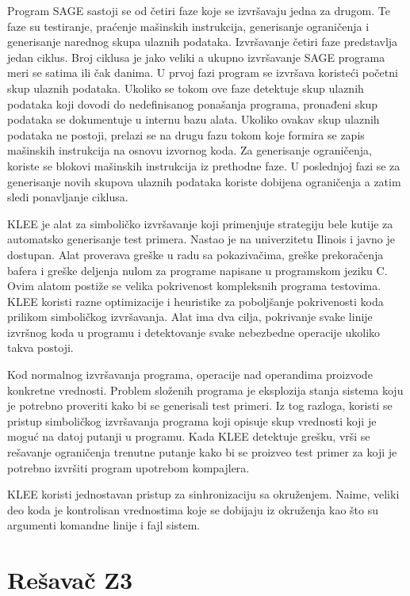 \documentclass[12pt,oneside]{memoir}
\begin{document}
\par
Program SAGE sastoji se od četiri faze koje se izvršavaju jedna za drugom. Te faze su testiranje, praćenje mašinskih instrukcija, generisanje ograničenja i generisanje narednog skupa ulaznih podataka. Izvršavanje četiri faze predstavlja jedan ciklus. Broj ciklusa je jako veliki a ukupno izvršavanje SAGE programa meri se satima ili čak danima. 
U prvoj fazi program se izvršava koristeći početni skup ulaznih podataka. Ukoliko se tokom ove faze detektuje skup ulaznih podataka koji dovodi do nedefinisanog ponašanja programa, pronađeni skup podataka se dokumentuje u internu bazu alata. Ukoliko ovakav skup ulaznih podataka ne postoji, prelazi se na drugu fazu tokom koje formira se zapis mašinskih instrukcija na osnovu izvornog koda. Za generisanje ograničenja, koriste se blokovi mašinskih instrukcija iz prethodne faze. U poslednjoj fazi se za generisanje novih skupova ulaznih podataka koriste dobijena ograničenja a zatim sledi ponavljanje ciklusa. 
\par
KLEE \cite{ToolKLEE} je alat za simboličko izvršavanje \cite{SymbolicExecution} koji primenjuje strategiju bele kutije za automatsko generisanje test primera. 
Nastao je na univerzitetu Ilinois i javno je dostupan.
Alat proverava greške u radu sa pokazivačima, greške prekoračenja bafera i greške deljenja nulom za programe napisane u programskom jeziku C. Ovim alatom postiže se velika pokrivenost kompleksnih programa testovima. KLEE koristi razne optimizacije i heuristike za poboljšanje pokrivenosti koda prilikom simboličkog izvršavanja. Alat ima dva cilja, pokrivanje svake linije izvršnog koda u programu i detektovanje svake nebezbedne operacije ukoliko takva postoji. \par
Kod normalnog izvršavanja programa, operacije nad operandima proizvode konkretne vrednosti. Problem složenih programa je eksplozija stanja sistema koju je potrebno proveriti kako bi se generisali test primeri. Iz tog razloga, koristi se pristup simboličkog izvršavanja programa koji opisuje skup vrednosti koji je moguć na datoj putanji u programu. Kada KLEE detektuje grešku, vrši se rešavanje ograničenja trenutne putanje kako bi se proizveo test primer za koji je potrebno izvršiti program upotrebom kompajlera. 
\par 
KLEE koristi jednostavan pristup za sinhronizaciju sa okruženjem. Naime, veliki deo koda je kontrolisan vrednostima koje se dobijaju iz okruženja kao što su argumenti komandne linije i fajl sistem. 
 
\chapter{Rešavač Z3} \label{resavac}
\label{chp:razrada}
\end{document}
